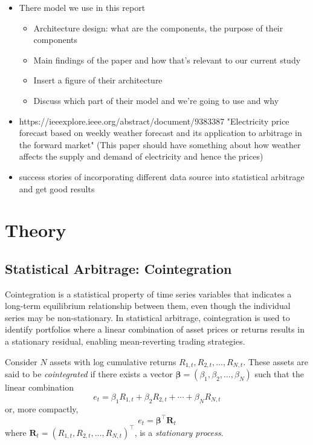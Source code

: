 \documentclass[12pt]{article}
\begin{document}
\begin{itemize}
    \item There model we use in this report
        \begin{itemize}
            \item Architecture design: what are the components, the purpose of their components 
            \item Main findings of the paper and how that's relevant to our current study 
            \item Insert a figure of their architecture
            \item Discuss which part of their model and we're going to use and why
        \end{itemize}
    \item https://ieeexplore.ieee.org/abstract/document/9383387
"Electricity price forecast based on weekly weather forecast and its application to arbitrage in the forward market" (This paper should have something about how weather affects the supply and demand of electricity and hence the prices)
    \item success stories of incorporating different data source into statistical arbitrage and get good results 
\end{itemize}



\clearpage




\section{Theory}

\subsection{Statistical Arbitrage: Cointegration}

Cointegration is a statistical property of time series variables that indicates a long-term equilibrium relationship between them, even though the individual series may be non-stationary. In statistical arbitrage, cointegration is used to identify portfolios where a linear combination of asset prices or returns results in a stationary residual, enabling mean-reverting trading strategies. 

Consider $N$ assets with log cumulative returns $R_{1,t}, R_{2,t}, \ldots, R_{N,t}$. These assets are said to be \textit{cointegrated} if there exists a vector $\boldsymbol{\beta} = (\beta_1, \beta_2, \ldots, \beta_N)$ such that the linear combination
\[
    e_t = \beta_1 R_{1,t} + \beta_2 R_{2,t} + \cdots + \beta_N R_{N,t}
\]
or, more compactly,
\begin{equation}
    e_t = \boldsymbol{\beta}^\top \mathbf{R}_t
    \label{eq:cointegration_all}
\end{equation}
where $\mathbf{R}_t = (R_{1,t}, R_{2,t}, \ldots, R_{N,t})^\top$, is a \textit{stationary process}.
\end{document}
